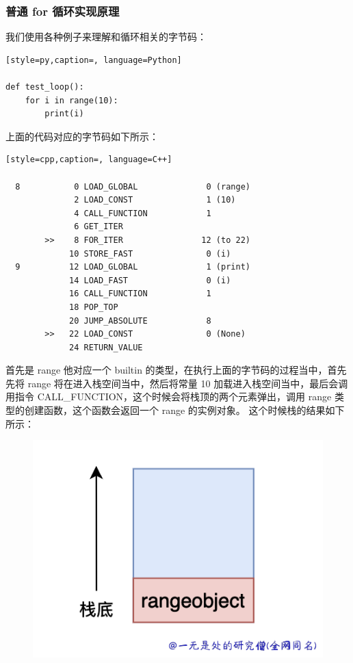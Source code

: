 \subsubsection{普通 for 循环实现原理}
我们使用各种例子来理解和循环相关的字节码：
\begin{lstlisting}[style=py,caption=, language=Python]

def test_loop():
    for i in range(10):
        print(i)
\end{lstlisting}
上面的代码对应的字节码如下所示：
\begin{lstlisting}[style=cpp,caption=, language=C++]

  8           0 LOAD_GLOBAL              0 (range)
              2 LOAD_CONST               1 (10)
              4 CALL_FUNCTION            1
              6 GET_ITER
        >>    8 FOR_ITER                12 (to 22)
             10 STORE_FAST               0 (i)
  9          12 LOAD_GLOBAL              1 (print)
             14 LOAD_FAST                0 (i)
             16 CALL_FUNCTION            1
             18 POP_TOP
             20 JUMP_ABSOLUTE            8
        >>   22 LOAD_CONST               0 (None)
             24 RETURN_VALUE
\end{lstlisting}
首先是 range 他对应一个 builtin 的类型，在执行上面的字节码的过程当中，首先先将 range 将在进入栈空间当中，然后将常量 10 加载进入栈空间当中，最后会调用指令 CALL\_FUNCTION，这个时候会将栈顶的两个元素弹出，调用 range 类型的创建函数，这个函数会返回一个 range 的实例对象。
这个时候栈的结果如下所示：

    \begin{figure}[H]
        \centering
            \includegraphics[scale=.25]{images/66-bytecode.png}
						\caption{ }
        \label{fig:my_label}
    \end{figure}
    
